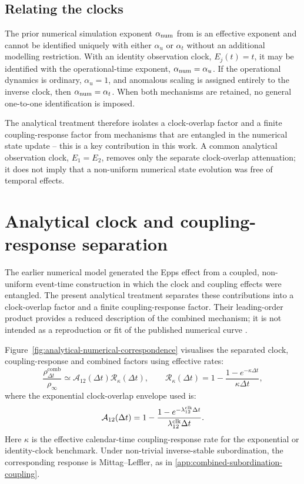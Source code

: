 \documentclass[5p,final]{elsarticle}
\begin{document}
\subsection{Relating the clocks}

The prior numerical simulation exponent $\alpha_{\rm num}$ from \cite{BauerDianaGebbie2024} is an effective exponent and cannot be identified uniquely with either $\alpha_u$ or $\alpha_t$ without an additional modelling restriction. With an identity observation clock, $E_j(t)=t$, it may be identified with the operational-time exponent, $\alpha_{\rm num}=\alpha_u$. If the operational dynamics is ordinary, $\alpha_u=1$, and anomalous scaling is assigned entirely to the inverse clock, then $\alpha_{\rm num}=\alpha_t$. When both mechanisms are retained, no general one-to-one identification is imposed.

The analytical treatment therefore isolates a clock-overlap factor and a finite coupling-response factor from mechanisms that are entangled in the numerical state update -- this is a key contribution in this work. A common analytical observation clock, $E_1=E_2$, removes only the separate clock-overlap attenuation; it does not imply that a non-uniform numerical state evolution was free of temporal effects.


\section{Analytical clock and coupling-response separation}
\label{app:analytical-numerical-correspondence}

The earlier numerical model generated the Epps effect from a coupled, non-uniform event-time construction in which the clock and coupling effects were entangled. The present analytical treatment separates these contributions into a clock-overlap factor and a finite coupling-response factor. Their leading-order product provides a reduced description of the combined mechanism; it is not intended as a reproduction or fit of the published numerical curve \citep{BauerDianaGebbie2024}.

Figure~\ref{fig:analytical-numerical-correspondence} visualises the separated clock, coupling-response and combined factors using effective rates:
\begin{equation}
\frac{\rho_{\Delta t}^{\mathrm{comb}}}{\rho_\infty}
\simeq
\mathcal A_{12}(\Delta t)\mathcal R_\kappa(\Delta t),
\qquad
\mathcal R_\kappa(\Delta t)
=1-\frac{1-e^{-\kappa\Delta t}}{\kappa\Delta t},
\label{eq:analytical-numerical-correspondence}
\end{equation}
where the exponential clock-overlap envelope used is:
\begin{equation}
\mathcal A_{12}(\Delta t)
=1-\frac{1-e^{-\lambda_{12}^{\rm clk}\Delta t}}
{\lambda_{12}^{\rm clk}\Delta t}.
\end{equation}
Here $\kappa$ is the effective calendar-time coupling-response rate for the exponential or identity-clock benchmark. Under non-trivial inverse-stable subordination, the corresponding response is Mittag--Leffler, as in \ref{app:combined-subordination-coupling}.
\end{document}
